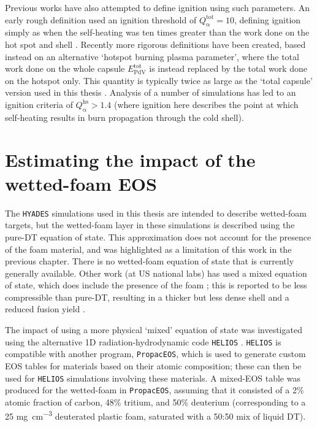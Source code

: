 Previous works have also attempted to define ignition using such parameters. An early rough definition used an ignition threshold of $Q^\mathrm{{tot}}_{\mathrm{\alpha}} = 10$, defining ignition simply as when the self-heating was ten times greater than the work done on the hot spot and shell \cite{Betti2011}. Recently more rigorous definitions have been created, based instead on an alternative `hotspot burning plasma parameter', where the total work done on the whole capsule $E^\mathrm{{tot}}_{\mathrm{PdV}}$ is instead replaced by the total work done on the hotspot only. This quantity is typically twice as large as the `total capsule' version used in this thesis \cite{Betti2015}. Analysis of a number of simulations has led to an ignition criteria of  $Q^\mathrm{{hs}}_{\mathrm{\alpha}} > 1.4$ \cite{Christopherson2020} (where ignition here describes the point at which self-heating results in burn propagation through the cold shell).

\section{Estimating the impact of the wetted-foam EOS} \label{sec:MixedEOS}

The \texttt{HYADES} simulations used in this thesis are intended to describe wetted-foam targets, but the wetted-foam layer in these simulations is described using the pure-DT equation of state. This approximation does not account for the presence of the foam material, and was highlighted as a limitation of this work in the previous chapter. There is no wetted-foam equation of state that is currently generally available. Other work (at US national labs) has used a mixed equation of state, which does include the presence of the foam \cite{Olson2021}; this is reported to be less compressible than pure-DT, resulting in a thicker but less dense shell and a reduced fusion yield \cite{Olson2020a}.

The impact of using a more physical `mixed' equation of state was investigated using the alternative 1D radiation-hydrodynamic code \texttt{HELIOS} \cite{MacFarlane2006}. \texttt{HELIOS} is compatible with another program, \texttt{PropacEOS}, which is used to generate custom EOS tables for materials based on their atomic composition; these can then be used for \texttt{HELIOS} simulations involving these materials. A mixed-EOS table was produced for the wetted-foam in \texttt{PropacEOS}, assuming that it consisted of a 2\% atomic fraction of carbon, 48\% tritium, and 50\% deuterium (corresponding to a 25 \unit{\milli\gram\per\centi\meter\cubed} deuterated plastic foam, saturated with a 50:50 mix of liquid DT). 

